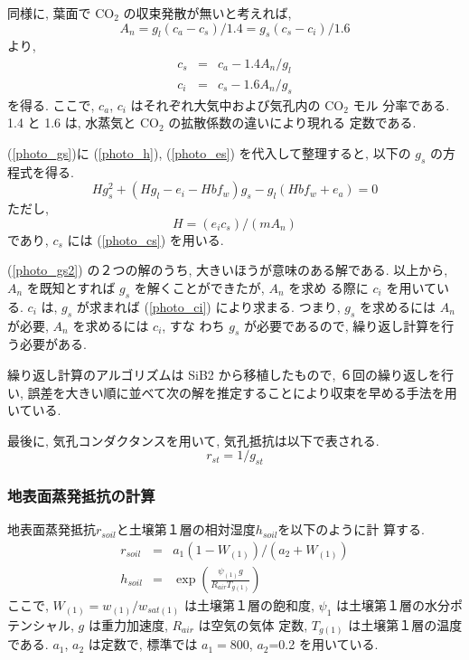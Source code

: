 同様に, 葉面で CO$_2$ の収束発散が無いと考えれば, 
\begin{equation}
 A_n = g_l(c_a - c_s)/1.4
     = g_s(c_s - c_i)/1.6 
\label{photo_csci}
\end{equation}
より, 
\begin{eqnarray}
 c_s &=& c_a - 1.4 A_n/g_l \\
\label{photo_cs}
 c_i &=& c_s - 1.6 A_n/g_s
\label{photo_ci}
\end{eqnarray}
を得る. ここで, $c_a$, $c_i$ はそれぞれ大気中および気孔内の CO$_2$ モル
分率である. 1.4 と 1.6 は, 水蒸気と CO$_2$ の拡散係数の違いにより現れる
定数である. 

(\ref{photo_gs})に (\ref{photo_h}), (\ref{photo_es})
を代入して整理すると, 以下の $g_s$ の方程式を得る. 
\begin{equation}
 H g_s^2 + ( H g_l - e_i - H b f_w ) g_s - g_l ( H b f_w + e_a ) = 0
\label{photo_gs2}
\end{equation}
ただし, 
\begin{equation}
 H = (e_i c_s)/(m A_n)
\end{equation}
であり, $c_s$ には (\ref{photo_cs}) を用いる. 

(\ref{photo_gs2}) の２つの解のうち, 大きいほうが意味のある解である. 
以上から, $A_n$ を既知とすれば $g_s$ を解くことができたが, $A_n$ を求め
る際に $c_i$ を用いている. $c_i$ は, $g_s$ が求まれば (\ref{photo_ci})
により求まる. 
つまり, $g_s$ を求めるには $A_n$ が必要, $A_n$ を求めるには $c_i$, すな
わち $g_s$ が必要であるので, 繰り返し計算を行う必要がある. 

繰り返し計算のアルゴリズムは SiB2 から移植したもので, ６回の繰り返しを行
い, 誤差を大きい順に並べて次の解を推定することにより収束を早める手法を用
いている. 

最後に, 気孔コンダクタンスを用いて, 気孔抵抗は以下で表される. 
\begin{equation}
 r_{st} = 1/g_{st}
\end{equation}

\subsubsection{地表面蒸発抵抗の計算}

地表面蒸発抵抗$r_{soil}$と土壌第１層の相対湿度$h_{soil}$を以下のように計
算する. 
\begin{eqnarray}
 r_{soil} &=& a_1 ( 1 - W_{(1)} ) / ( a_2 + W_{(1)} ) \\
 h_{soil} &=& \exp \left(\frac{\psi_{(1)} g}{R_{air} T_{g(1)}} \right) 
\end{eqnarray}
ここで, $W_{(1)} = w_{(1)}/w_{sat(1)}$ は土壌第１層の飽和度, $\psi_{1}$
は土壌第１層の水分ポテンシャル, $g$ は重力加速度, $R_{air}$ は空気の気体
定数, $T_{g(1)}$ は土壌第１層の温度である. 
$a_1$, $a_2$ は定数で, 標準では $a_1=800$, $a_2$=0.2 を用いている. 

